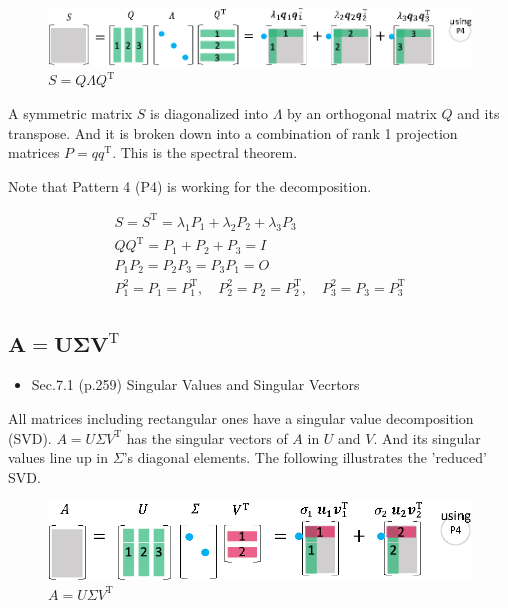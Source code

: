 \documentclass[letterpaper]{article}
\DeclareRobustCommand\transp{^{\mathrm{T}}}
\begin{document}
\begin{figure}[H]
  \centering
  \includegraphics[scale=0.8]{EVD.eps}
  \caption{$S=Q \Lambda Q\transp$}
\end{figure}

A symmetric matrix $S$ is diagonalized into $\Lambda$  by an orthogonal matrix $Q$
and its transpose. And it is broken down into a combination of rank 1 projection matrices $P=qq\transp$.
This is the spectral theorem.

Note that Pattern 4 (P4) is working for the decomposition.

\begin{gather*}
  S=S\transp = \lambda_1 P_1 + \lambda_2 P_2 + \lambda_3 P_3\\
  QQ\transp = P_1 + P_2 + P_3 = I \\
  P_1 P_2 = P_2 P_3 = P_3 P_1 = O\\
  P_1^2 =P_1=P_1\transp, \quad P_2^2=P_2=P_2\transp, \quad P_3^2=P_3=P_3\transp
\end{gather*}

\subsection{$\boldsymbol{A=U \Sigma V\transp}$}


\begin{itemize}
  \item Sec.7.1 (p.259) Singular Values and Singular Vecrtors
\end{itemize}

All matrices including rectangular ones have a singular value decomposition (SVD).
$A=U \Sigma V\transp$ has the singular vectors of $A$ in $U$ and $V$.
And its singular values line up in $\Sigma$'s diagonal elements.
The following illustrates the 'reduced' SVD.


\begin{figure}[H]
  \centering
  \includegraphics[scale=0.8]{SVD.eps}
  \caption{$A=U \Sigma V\transp$}
\end{figure}
\end{document}
